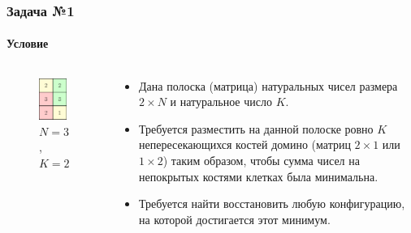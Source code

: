 \documentclass{beamer}
\begin{document}
\begin{frame}
\frametitle{Задача №1}
\framesubtitle{Условие}

\begin{columns}[onlytextwidth]
\begin{column}{0.3\textwidth}
    \begin{figure}
    \centering
    \caption{$N = 3$, $K = 2$}
    \includegraphics[width=0.9\textwidth]{drawing-1/drawing-figure0.eps}
    \end{figure}
\end{column}

\begin{column}{0.7\textwidth}
    \begin{itemize}
        \item Дана полоска (матрица) натуральных чисел размера $2 \times N$ и натуральное число $K$.
        \item Требуется разместить на данной полоске ровно $K$ непересекающихся костей домино (матриц $2\times1$ или $1\times 2$) таким образом, чтобы сумма чисел на непокрытых костями клетках была минимальна. 
        \item Требуется найти восстановить любую конфигурацию, на которой достигается этот минимум.
    \end{itemize}
\end{column}
\end{columns}
\end{frame}
\end{document}
